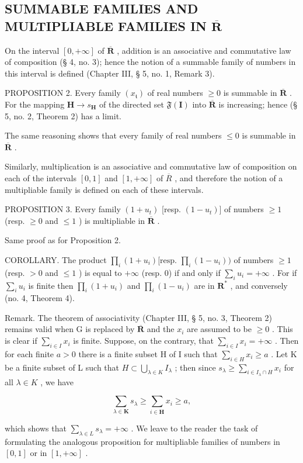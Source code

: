 \subsection{\texorpdfstring{SUMMABLE FAMILIES AND MULTIPLIABLE FAMILIES IN \(\overline{\mathbf{R}}\)}{SUMMABLE FAMILIES AND MULTIPLIABLE FAMILIES IN \textbackslash overline\{\textbackslash mathbf\{R\}\}}}

On the interval \([0, +\infty]\) of \(\overline{\mathbf{R}}\) , addition is an associative and commutative law of composition (§ 4, no. 3); hence the notion of a summable family of numbers in this interval is defined (Chapter III, § 5, no. 1, Remark 3).

PROPOSITION 2. Every family \((x_{\mathfrak{t}})\) of real numbers \(\geqslant 0\) is summable in \(\overline{\mathbf{R}}\) . For the mapping \(\mathbf{H} \to s_{\mathbf{H}}\) of the directed set \(\mathfrak{F}(\mathbf{I})\) into \(\overline{\mathbf{R}}\) is increasing; hence (§ 5, no. 2, Theorem 2) has a limit.

The same reasoning shows that every family of real numbers \(\leqslant 0\) is summable in \(\overline{\mathbf{R}}\) .

Similarly, multiplication is an associative and commutative law of composition on each of the intervals \([0, 1]\) and \([1, +\infty]\) of \(\overline{R}\) , and therefore the notion of a multipliable family is defined on each of these intervals.

PROPOSITION 3. Every family \((1 + u_{t})\) {[}resp. \((1 - u_{t})]\) of numbers \(\geqslant 1\) (resp. \(\geqslant 0\) and \(\leqslant 1\) ) is multipliable in \(\overline{\mathbf{R}}\) .

Same proof as for Proposition 2.

COROLLARY. The product \(\prod_{i} (1 + u_i) [\text{resp. } \prod_{i} (1 - u_i))\) of numbers \(\geqslant 1\) (resp. \(>0\) and \(\leqslant 1\) ) is equal to \(+\infty\) (resp. 0) if and only if \(\sum_{i} u_i = +\infty\) . For if \(\sum_{i} u_i\) is finite then \(\prod_{i} (1 + u_i)\) and \(\prod_{i} (1 - u_i)\) are in \(\mathbf{R}^*\) , and conversely (no. 4, Theorem 4).

Remark. The theorem of associativity (Chapter III, § 5, no. 3, Theorem 2) remains valid when G is replaced by \(\overline{\mathbf{R}}\) and the \(x_{i}\) are assumed to be \(\geqslant 0\) . This is clear if \(\sum_{i \in I} x_{i}\) is finite. Suppose, on the contrary, that \(\sum_{i \in I} x_{i} = +\infty\) . Then for each finite \(a > 0\) there is a finite subset H of I such that \(\sum_{i \in H} x_{i} \geqslant a\) . Let K be a finite subset of L such that \(H \subset \bigcup_{\lambda \in K} I_{\lambda}\) ; then since \(s_{\lambda} \geqslant \sum_{i \in I_{\lambda} \cap H} x_{i}\) for all \(\lambda \in K\) , we have

\[
\sum_ {\lambda \in \mathbf {K}} s _ {\lambda} \geqslant \sum_ {i \in \mathbf {H}} x _ {i} \geqslant a,
\]

which shows that \(\sum_{\lambda \in L} s_{\lambda} = +\infty\) . We leave to the reader the task of formulating the analogous proposition for multipliable families of numbers in \([0, 1]\) or in \([1, +\infty]\) .

